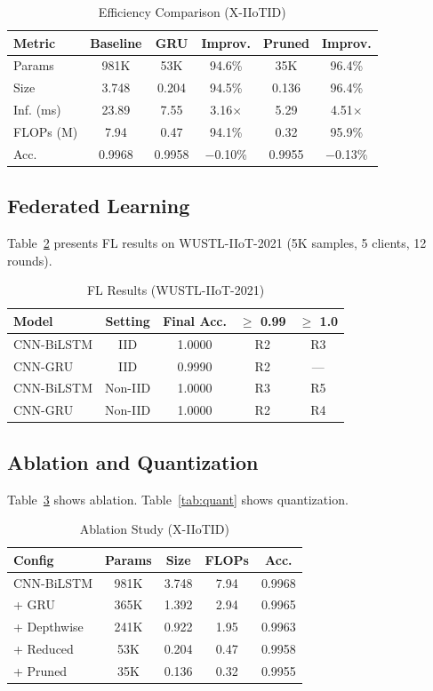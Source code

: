 \documentclass[12pt,a4paper]{article}
\begin{document}
\begin{table}[hbt]
\centering
\caption{Efficiency Comparison (X-IIoTID)}
\label{tab:efficiency}
\begin{tabular}{lccccc}
\toprule
Metric & Baseline & GRU & Improv. & Pruned & Improv. \\
\midrule
Params & 981K & 53K & 94.6\% & 35K & 96.4\% \\
Size & 3.748 & 0.204 & 94.5\% & 0.136 & 96.4\% \\
Inf. (ms) & 23.89 & 7.55 & 3.16$\times$ & 5.29 & 4.51$\times$ \\
FLOPs (M) & 7.94 & 0.47 & 94.1\% & 0.32 & 95.9\% \\
Acc. & 0.9968 & 0.9958 & $-$0.10\% & 0.9955 & $-$0.13\% \\
\bottomrule
\end{tabular}
\end{table}

\subsection{Federated Learning}

Table~\ref{tab:fl} presents FL results on WUSTL-IIoT-2021 (5K samples, 5 clients, 12 rounds).

\begin{table}[hbt]
\centering
\caption{FL Results (WUSTL-IIoT-2021)}
\label{tab:fl}
\begin{tabular}{lcccc}
\toprule
Model & Setting & Final Acc. & $\ge$ 0.99 & $\ge$ 1.0 \\
\midrule
CNN-BiLSTM & IID & 1.0000 & R2 & R3 \\
CNN-GRU & IID & 0.9990 & R2 & --- \\
CNN-BiLSTM & Non-IID & 1.0000 & R3 & R5 \\
CNN-GRU & Non-IID & 1.0000 & R2 & R4 \\
\bottomrule
\end{tabular}
\end{table}

\subsection{Ablation and Quantization}

Table~\ref{tab:ablation} shows ablation. Table~\ref{tab:quant} shows quantization.

\begin{table}[hbt]
\centering
\caption{Ablation Study (X-IIoTID)}
\label{tab:ablation}
\begin{tabular}{lcccc}
\toprule
Config & Params & Size & FLOPs & Acc. \\
\midrule
CNN-BiLSTM & 981K & 3.748 & 7.94 & 0.9968 \\
+ GRU & 365K & 1.392 & 2.94 & 0.9965 \\
+ Depthwise & 241K & 0.922 & 1.95 & 0.9963 \\
+ Reduced & 53K & 0.204 & 0.47 & 0.9958 \\
+ Pruned & 35K & 0.136 & 0.32 & 0.9955 \\
\bottomrule
\end{tabular}
\end{table}
\end{document}
